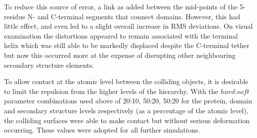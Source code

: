 To reduce this source of error, a link as added between the mid-points of the 5-residue N- and C-terminal
segments that connect domains.  However, this had little effect, and even led to a slight overall increase in RMS
deviations.   On visual examination the distortions appeared to remain associated with the terminal helix
which was still able to be markedly displaced despite the C-terminal tether but now this occurred more
at the expense of disrupting other neighbouring secondary structure elements.

To allow contact at the atomic level between the colliding objects,
it is desirable to limit the repulsion from the higher levels of the hierarchy.
With the $hard$:$soft$ parameter combinations used above of 20:10, 50:20, 50:20 for the protein, domain 
and secondary structure levels respectively (as a percentage of the atomic level), the colliding surfaces
were able to make contact but without serious deformation occurring.   These values were adopted for
all further simulations.

